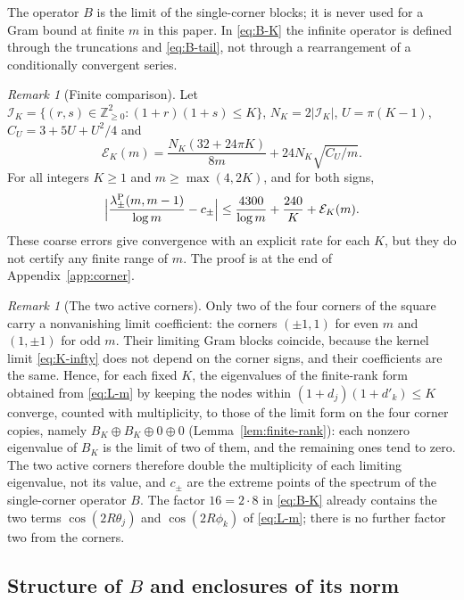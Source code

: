 \documentclass[preprint,12pt,a4paper]{elsarticle}
\theoremstyle{remark}
\newtheorem{remark}[theorem]{Remark}
\newcommand{\Pa}{\mathrm P}
\begin{document}
The operator $B$ is the limit of the single-corner blocks; it is never used
for a Gram bound at finite $m$ in this paper. In \eqref{eq:B-K} the infinite
operator is defined through the truncations and \eqref{eq:B-tail}, not through
a rearrangement of a conditionally convergent series.

\begin{remark}[Finite comparison]\label{rem:finite-comparison}
Let $\mathcal I_K=\{(r,s)\in\mathbb Z_{\ge0}^2:(1+r)(1+s)\le K\}$, $N_K=2|\mathcal I_K|$,
$U=\pi(K-1)$, $C_U=3+5U+U^2/4$ and
\[
 \mathcal E_K(m)=\frac{N_K(32+24\pi K)}{8m}+24N_K\sqrt{C_U/m}.
\]
For all integers $K\ge1$ and $m\ge\max(4,2K)$, and for both signs,
\begin{equation}\label{eq:finite-comparison}
 \Bigl|\frac{\lambda^\Pa_\pm(m,m-1)}{\log m}-c_\pm\Bigr|
 \le\frac{4300}{\log m}+\frac{240}K+\mathcal E_K(m).
\end{equation}
These coarse errors give convergence with an explicit rate for each $K$, but they
do not certify any finite range of $m$. The proof is at the end of
Appendix~\ref{app:corner}.
\end{remark}

\begin{remark}[The two active corners]\label{rem:two-corners}
Only two of the four corners of the square carry a nonvanishing limit
coefficient: the corners $(\pm1,1)$ for even $m$ and $(1,\pm1)$ for odd $m$.
Their limiting Gram blocks coincide, because the kernel limit
\eqref{eq:K-infty} does not depend on the corner signs, and their
coefficients are the same. Hence, for each fixed $K$, the eigenvalues of the finite-rank form obtained
from \eqref{eq:L-m} by keeping the nodes within $(1+d_j)(1+d'_k)\le K$
converge, counted with multiplicity, to those of the limit form on the four
corner copies, namely $B_K\oplus B_K\oplus0\oplus0$
(Lemma~\ref{lem:finite-rank}): each nonzero eigenvalue of $B_K$ is the limit of
two of them, and the remaining ones tend to zero. The two active
corners therefore double the multiplicity of each limiting eigenvalue,
not its value, and $c_\pm$ are the extreme points of the spectrum of the
single-corner operator $B$. The factor $16=2\cdot8$ in \eqref{eq:B-K} already
contains the two terms $\cos(2R\theta_j)$ and
$\cos(2R\phi_k)$ of \eqref{eq:L-m}; there is no further factor two from the
corners.
\end{remark}

\subsection{Structure of \texorpdfstring{$B$}{B} and enclosures of its norm}\label{sec:structure}
\end{document}
